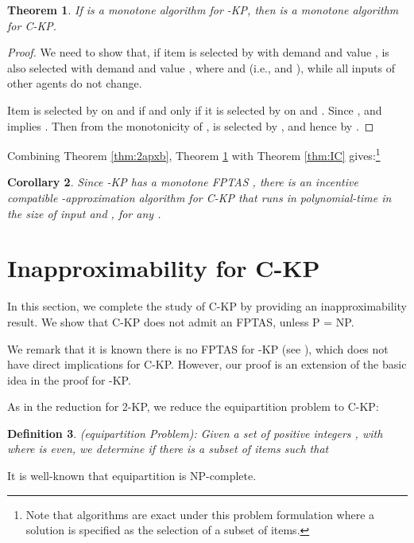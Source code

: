 \documentclass{aamas2013}
\newtheorem{theorem}{Theorem}[section]
\newtheorem{corollary}[theorem]{Corollary}
\newtheorem{definition}[theorem]{Definition}
\begin{document}
\begin{theorem} \label{thm:mon}
If  is a monotone algorithm for {-KP}, then  is a monotone algorithm for {\sc C-KP}.
\end{theorem}

\begin{proof}
We need to show that, if item  is selected by  with demand  and value ,  is also selected with demand  and value , where  and  (i.e.,  and ), while all inputs of other agents do not change.  

Item  is selected by  on  and  if and only if it is selected by  on  and . 
Since ,  and  implies . Then from the monotonicity of ,  is selected by , and hence by .
\end{proof}

Combining Theorem \ref{thm:2apxb}, Theorem \ref{thm:mon} with Theorem \ref{thm:IC} gives:\footnote{Note that algorithms are exact under this problem formulation where a solution is specified as the selection of a subset of items.} 
\begin{corollary}
\label{cor:2apxb}
Since {-KP} has a monotone FPTAS \cite{BKV05KS}, there is an incentive compatible -approximation algorithm for {\sc C-KP} that runs in polynomial-time in the size of input and , for any .
\end{corollary} 


\section{Inapproximability for C-KP}\label{sec:inappr}
\noindent
In this section, we complete the study of {\sc C-KP} by providing an inapproximability result. We show that {\sc C-KP} does not admit an FPTAS, unless P = NP.

We remark that it is known there is no FPTAS for {-KP} (see \cite{KPP10book}), which does not have direct implications for {\sc C-KP}.  However, our proof is an extension of the basic idea in the proof for {-KP}. 

As in the reduction for 2-KP, we reduce the {\sc equipartition} problem to {\sc C-KP}:

\begin{definition} ({\sc equipartition} Problem): Given a set of positive integers , with  where  is even, we determine if there is a subset of items  such that

\end{definition}
It is well-known that {\sc equipartition} is NP-complete.
\end{document}
